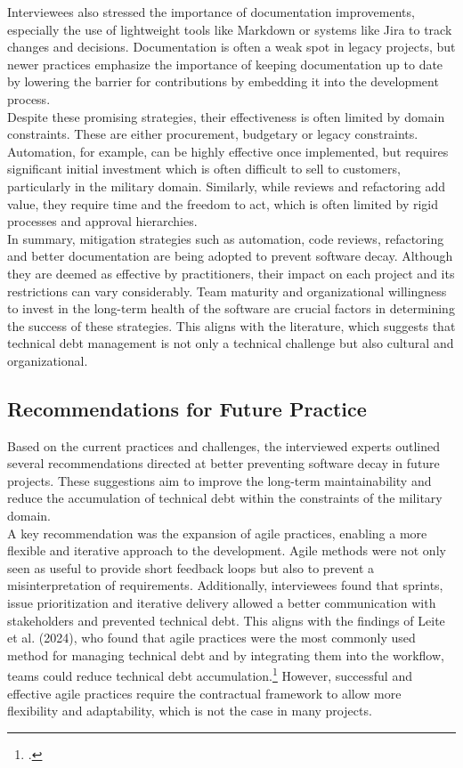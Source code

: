 Interviewees also stressed the importance of documentation improvements, especially the use of lightweight tools like Markdown or systems like Jira to track changes and decisions. Documentation is often a weak spot in legacy projects, but newer practices 
emphasize the importance of keeping documentation up to date by lowering the barrier for contributions by embedding it into the development process.\\

Despite these promising strategies, their effectiveness is often limited by domain constraints. These are either procurement, budgetary or legacy constraints. Automation, for example, can be highly effective once implemented, but requires significant initial investment which is often difficult to sell to customers, particularly in the military domain.
Similarly, while reviews and refactoring add value, they require time and the freedom to act, which is often limited by rigid processes and approval hierarchies.\\

In summary, mitigation strategies such as automation, code reviews, refactoring and better documentation are being adopted to prevent software decay. Although they are deemed as effective by practitioners, their impact on each project and its restrictions can vary considerably. Team maturity and organizational
willingness to invest in the long-term health of the software are crucial factors in determining the success of these strategies. This aligns with the literature, which suggests that technical debt management is not only a technical challenge but also cultural and organizational.\\

\subsection{Recommendations for Future Practice}
Based on the current practices and challenges, the interviewed experts outlined several recommendations directed at better preventing software decay in future projects. These suggestions aim to improve the long-term maintainability
and reduce the accumulation of technical debt within the constraints of the military domain.\\

A key recommendation was the expansion of agile practices, enabling a more flexible and iterative approach to the development. Agile methods were not only seen as useful to provide short feedback loops but also to prevent a misinterpretation of requirements.
Additionally, interviewees found that sprints, issue prioritization and iterative delivery allowed a better communication with stakeholders and prevented technical debt.
This aligns with the findings of Leite et al. (2024), who found that agile practices were the most commonly used method for managing technical debt and by integrating them into the workflow, teams could reduce technical debt accumulation.\footcite[318]{leiteTechnicalDebtManagement2024}
However, successful and effective agile practices require the contractual framework to allow more flexibility and adaptability, which is not the case in many projects.\\

